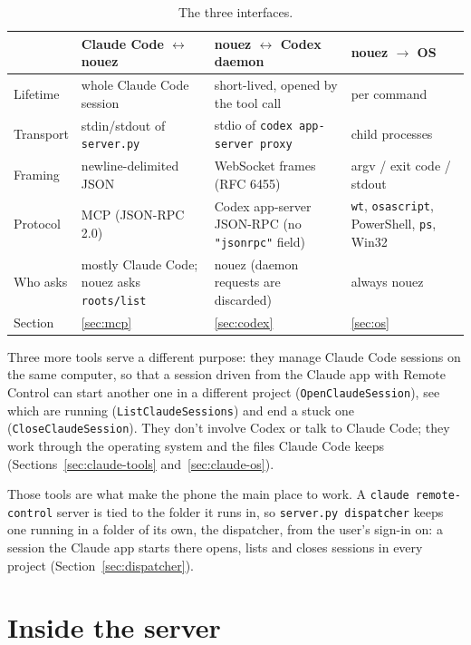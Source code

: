 \documentclass[10pt,a4paper]{article}
\newcommand{\code}[1]{\texttt{#1}}
\begin{document}
\begin{table}[h]
\centering\small
\begin{tabularx}{\textwidth}{@{}l X X X@{}}
\toprule
 & \textbf{Claude Code $\leftrightarrow$ nouez} & \textbf{nouez $\leftrightarrow$ Codex daemon} & \textbf{nouez $\rightarrow$ OS} \\
\midrule
Lifetime & whole Claude Code session & short-lived, opened by the tool call & per command \\
Transport & stdin/stdout of \code{server.py} & stdio of \code{codex app-server proxy} & child processes \\
Framing & newline-delimited JSON & WebSocket frames (RFC 6455) & argv / exit code / stdout \\
Protocol & MCP (JSON-RPC 2.0) & Codex app-server JSON-RPC (no \code{"jsonrpc"} field) & \code{wt}, \code{osascript}, PowerShell, \code{ps}, Win32 \\
Who asks & mostly Claude Code; nouez asks \code{roots/list} & nouez (daemon requests are discarded) & always nouez \\
Section & \ref{sec:mcp} & \ref{sec:codex} & \ref{sec:os} \\
\bottomrule
\end{tabularx}
\caption{The three interfaces.}
\end{table}

Three more tools serve a different purpose: they manage Claude Code sessions on the same computer,
so that a session driven from the Claude app with Remote Control can start another one in a
different project (\code{OpenClaudeSession}), see which are running (\code{ListClaudeSessions})
and end a stuck one (\code{CloseClaudeSession}). They don't involve Codex or talk to Claude Code;
they work through the operating system and the files Claude Code keeps
(Sections~\ref{sec:claude-tools} and~\ref{sec:claude-os}).

Those tools are what make the phone the main place to work. A \code{claude remote-control}
server is tied to the folder it runs in, so \code{server.py dispatcher} keeps one running in a
folder of its own, the dispatcher, from the user's sign-in on: a session the Claude app starts
there opens, lists and closes sessions in every project (Section~\ref{sec:dispatcher}).

\section{Inside the server}
\label{sec:inside}
\end{document}
